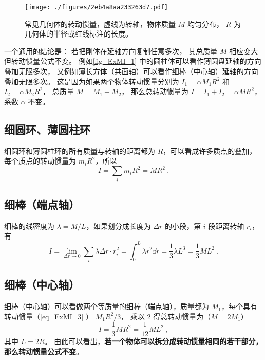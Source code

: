 

\begin{figure}[ht]
\centering
\texttt{[image: ./figures/2eb4a8aa233263d7.pdf]}
\caption{常见几何体的转动惯量，虚线为转轴，物体质量 $M$ 均匀分布， $R$ 为几何体的半径或红线标注的长度。}\label{fig_ExMI_1}
\end{figure}


一个通用的结论是： 若把刚体在延轴方向复制任意多次， 其总质量 $M$ 相应变大但转动惯量公式不变。 例如\autoref{fig_ExMI_1} 中的圆柱体可以看作薄圆盘延轴的方向叠加无限多次， 又例如薄长方体（共面轴）可以看作细棒（中心轴）延轴的方向叠加无限多次。 这是因为如果两个物体转动惯量分别为 $I_1 = \alpha M_1 R^2$ 和 $I_2 = \alpha M_2 R^2$， 总质量 $M = M_1 + M_2$， 那么总转动惯量为 $I = I_1 + I_2 = \alpha M R^2$， 系数 $\alpha$ 不变。

\subsection{细圆环、薄圆柱环}
细圆环和薄圆柱环的所有质量与转轴的距离都为 $R$，可以看成许多质点的叠加，每个质点的转动惯量为 $m_i R^2$，所以
\begin{equation}\label{eq_ExMI_4}
I = \sum_i m_i R^2 = M R^2~.
\end{equation}

\subsection{ 细棒（端点轴）}
细棒的线密度为 $\lambda  = M/L$，如果划分成长度为 $\Delta r$ 的小段，第 $i$ 段距离转轴 $r_i$， 有
\begin{equation}\label{eq_ExMI_3}
I = \lim_{\Delta r \to 0}\sum_i \lambda\Delta r \cdot r_i^2 =  \int_0^L \lambda r^2 \dd{r} = \frac{1}{3}\lambda L^3 = \frac{1}{3}M L^2~.
\end{equation}

\subsection{细棒（中心轴）}
细棒（中心轴）可以看做两个等质量的细棒（端点轴），质量都为 $M_1$，每个具有转动惯量（\autoref{eq_ExMI_3} ） $M_1 R^2/3$， 乘以 $2$ 得总转动惯量为（$M=2M_1$）
\begin{equation}\label{eq_ExMI_2}
I = \frac{1}{3} MR^2 = \frac{1}{12}ML^2~,
\end{equation}
其中 $L=2R$。 由此可以看出，\textbf{若一个物体可以拆分成转动惯量相同的若干部分，那么转动惯量公式不变}。

